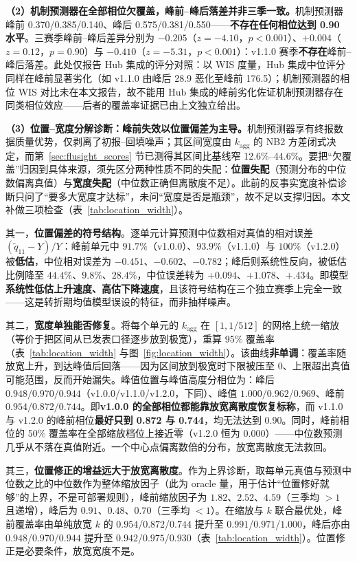 \documentclass[10pt,UTF8,a4paper,zihao=-4]{ctexart}
\theoremstyle{plain}
\theoremstyle{definition}
\theoremstyle{remark}
\begin{document}
\textbf{（2）机制预测器在全部相位欠覆盖，峰前--峰后落差并非三季一致。}机制预测器峰前 0.370/0.385/0.140、峰后 0.575/0.381/0.550——\textbf{不存在任何相位达到 0.90 水平}。三赛季峰前--峰后差异分别为 $-0.205$（$z=-4.10$，$p<0.001$）、$+0.004$（$z=0.12$，$p=0.90$）与 $-0.410$（$z=-5.31$，$p<0.001$）：v1.1.0 赛季\textbf{不存在}峰前--峰后落差。此处仅报告 Hub 集成的评分对照：以 WIS 度量，Hub 集成中位评分同样在峰前显著劣化（如 v1.1.0 由峰后 28.9 恶化至峰前 176.5）；机制预测器的相位 WIS 对比未在本文报告，故不能用 Hub 集成的峰前劣化佐证机制预测器存在同类相位效应——后者的覆盖率证据已由上文独立给出。

\textbf{（3）位置--宽度分解诊断：峰前失效以位置偏差为主导。}机制预测器享有终报数据质量优势，仅剥离了初报--回填噪声；其区间宽度由 $k_{\text{agg}}$ 的 NB2 方差闭式决定，而第~\ref{sec:flusight_scores} 节已测得其区间比基线窄 12.6\%--44.6\%。要把“欠覆盖”归因到具体来源，须先区分两种性质不同的失配：\textbf{位置失配}（预测分布的中位数偏离真值）与\textbf{宽度失配}（中位数正确但离散度不足）。此前的反事实宽度补偿诊断只问了“要多大宽度才达标”，未问“宽度是否是瓶颈”，故不足以支撑归因。本文补做三项检查（表~\ref{tab:location_width}）。

其一，\textbf{位置偏差的符号结构}。逐单元计算预测中位数相对真值的相对误差 $(\tilde q_{11} - Y)/Y$：峰前单元中 $91.7\%$（v1.0.0）、$93.9\%$（v1.1.0）与 $100\%$（v1.2.0）被\textbf{低估}，中位相对误差为 $-0.451$、$-0.602$、$-0.782$；峰后则系统性反向，被低估比例降至 $44.4\%$、$9.8\%$、$28.4\%$，中位误差转为 $+0.094$、$+1.078$、$+.434$。即模型\textbf{系统性低估上升速度、高估下降速度}，且该符号结构在三个独立赛季上完全一致——这是转折期均值模型误设的特征，而非抽样噪声。

其二，\textbf{宽度单独能否修复}。将每个单元的 $k_{\text{agg}}$ 在 $[1, 1/512]$ 的网格上统一缩放（等价于把区间从已发表口径逐步放到极宽），重算 95\% 覆盖率（表~\ref{tab:location_width} 与图~\ref{fig:location_width}）。该曲线\textbf{非单调}：覆盖率随放宽上升，到达峰值后回落——因为区间放到极宽时下限被压至 0、上限超出真值可能范围，反而开始漏失。峰值位置与峰值高度分相位为：峰后 $0.948/0.970/0.944$（v1.0.0/v1.1.0/v1.2.0，下同）、峰值 $1.000/0.962/0.969$、峰前 $0.954/0.872/0.744$。即\textbf{v1.0.0 的全部相位都能靠放宽离散度恢复标称}，而 v1.1.0 与 v1.2.0 的峰前相位\textbf{最好只到 0.872 与 0.744}，均无法达到 0.90。同时，峰前相位的 50\% 覆盖率在全部缩放档位上接近零（v1.2.0 恒为 0.000）——中位数预测几乎从不落在真值附近。一个中心点偏离数倍的分布，放宽离散度无法救回。

其三，\textbf{位置修正的增益远大于放宽离散度}。作为上界诊断，取每单元真值与预测中位数之比的中位数作为整体缩放因子（此为 oracle 量，用于估计“位置修好就够”的上界，不是可部署规则），峰前缩放因子为 $1.82$、$2.52$、$4.59$（三季均 $>1$ 且递增），峰后为 $0.91$、$0.48$、$0.70$（三季均 $<1$）。在缩放与 $k$ 联合最优处，峰前覆盖率由单纯放宽 $k$ 的 $0.954$/$0.872$/$0.744$ 提升至 $0.991$/$0.971$/$1.000$，峰后亦由 $0.948$/$0.970$/$0.944$ 提升至 $0.942$/$0.975$/$0.930$（表~\ref{tab:location_width}）。位置修正是必要条件，放宽宽度不是。
\end{document}
